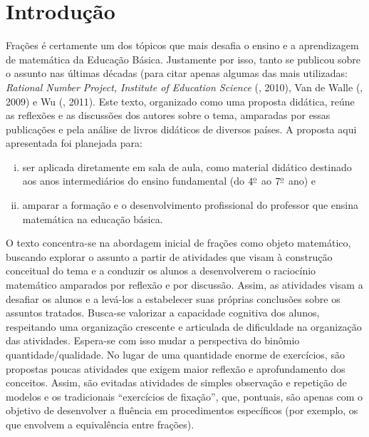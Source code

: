 
%
%
% 

\setcounter{chapter}{-1}
\chapter{Introdução}



Frações é certamente um dos tópicos que mais desafia o ensino e a aprendizagem de matemática da Educação Básica. Justamente por isso, tanto se publicou sobre o assunto nas últimas décadas (para citar apenas algumas das mais utilizadas:  {\it Rational Number Project, Institute of Education Science} (\cite{IES}, 2010), Van de Walle (\cite{Walle}, 2009) e Wu (\cite{Wu}, 2011). Este texto, organizado como uma proposta didática,  reúne as reflexões e as discussões dos autores sobre o tema, amparadas por essas publicações e pela análise de livros didáticos de diversos países. A proposta aqui apresentada foi planejada para:

\begin{enumerate}[(i)]
\item  ser aplicada diretamente em sala de aula, como material didático destinado aos anos intermediários do ensino fundamental (do $4^{\textrm{\underline{o}}}$ ao $7^{\textrm{\underline{o}}}$ ano) e
\item amparar a formação e o desenvolvimento profissional do professor que ensina matemática na educação básica.
\end{enumerate}

O texto concentra-se na abordagem inicial de frações como objeto matemático, buscando explorar o assunto a partir de atividades que visam à construção conceitual do tema e a conduzir os alunos a desenvolverem o raciocínio matemático amparados por reflexão e por discussão. Assim, as atividades visam a desafiar os alunos e a levá-los a estabelecer suas próprias conclusões sobre os assuntos tratados. Busca-se valorizar a capacidade cognitiva dos alunos, respeitando uma organização crescente e articulada de diﬁculdade na organização das atividades. Espera-se com isso mudar a perspectiva do binômio quantidade/qualidade. No lugar de uma quantidade enorme de exercícios, são propostas poucas  atividades que exigem maior reflexão e aprofundamento dos conceitos. Assim, são evitadas atividades de simples observação e repetição de modelos e os tradicionais ``exercícios de fixação'', que, pontuais, são apenas com o objetivo de desenvolver a fluência em procedimentos específicos (por exemplo, os que envolvem a equivalência entre frações).


